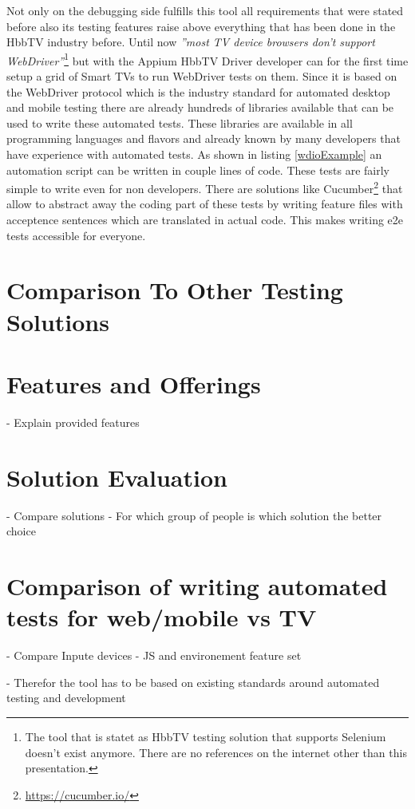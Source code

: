 Not only on the debugging side fulfills this tool all requirements that were stated before also its testing
features raise above everything that has been done in the HbbTV industry before. Until now \textit{''most TV
device browsers don’t support WebDriver''}\cite{sengo}\footnote{The tool that is statet as HbbTV testing solution
that supports Selenium doesn't exist anymore. There are no references on the internet other than this presentation.}
but with the Appium HbbTV Driver developer can for the first time setup a grid of Smart TVs to run WebDriver
tests on them. Since it is based on the WebDriver protocol which is the industry standard for automated desktop
and mobile testing there are already hundreds of libraries available that can be used to write these automated tests.
These libraries are available in all programming languages and flavors and already known by many developers that
have experience with automated tests. As shown in listing \ref{wdioExample} an automation script can be written
in couple lines of code. These tests are fairly simple to write even for non developers. There are solutions like
Cucumber\footnote{\url{https://cucumber.io/}} that allow to abstract away the coding part of these tests by writing
feature files with acceptence sentences which are translated in actual code. This makes writing e2e tests accessible
for everyone.

\section{Comparison To Other Testing Solutions\label{sec:businessmodel}}



\section{Features and Offerings\label{sec:features}}

- Explain provided features

\section{Solution Evaluation\label{sec:usab}}

- Compare solutions
- For which group of people is which solution the better choice

\section{Comparison of writing automated tests for web/mobile vs TV\label{sec:diffInWritingTests}}

- Compare Inpute devices
- JS and environement feature set


- Therefor the tool has to be based on existing standards around automated testing and development
